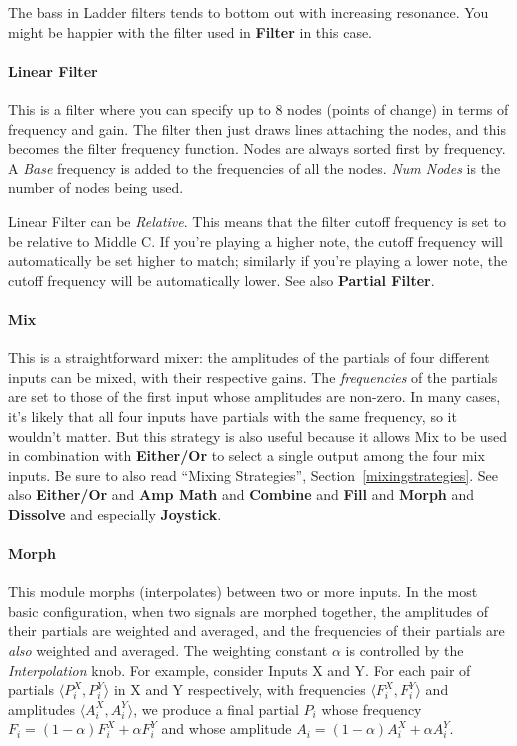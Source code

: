 \documentclass{article}
\begin{document}
The bass in Ladder filters tends to bottom out with increasing resonance.  You might be happier with the filter used in {\bf Filter} in this case.

\paragraph{Linear Filter} This is a filter where you can specify up to 8 nodes (points of change) in terms of frequency and gain.  The filter then just draws lines attaching the nodes, and this becomes the filter frequency function.  Nodes are always sorted first by frequency.  A {\it Base} frequency is added to the frequencies of all the nodes.  {\it Num Nodes} is the number of nodes being used.

Linear Filter can be {\it Relative}.  This means that the filter cutoff frequency is set to be relative to Middle C.  If you're playing a higher note, the cutoff frequency will automatically be set higher to match; similarly if you're playing a lower note, the cutoff frequency will be automatically lower.  See also {\bf Partial Filter}.

\paragraph{Mix} This is a straightforward mixer: the amplitudes of the partials of four different inputs can be mixed, with their respective gains.  The {\it frequencies} of the partials are set to those of the first input whose amplitudes are non-zero.  In many cases, it's likely that all four inputs have partials with the same frequency, so it wouldn't matter.  But this strategy is also useful because it allows Mix to be used in combination with {\bf Either/Or} to select a single output among the four mix inputs.  Be sure to also read ``Mixing Strategies'', Section~\ref{mixingstrategies}.  See also {\bf Either/Or} and {\bf Amp Math} and {\bf Combine} and {\bf Fill} and {\bf Morph} and {\bf Dissolve} and especially {\bf Joystick}.

\paragraph{Morph} This module morphs (interpolates) between two or more inputs.  In the most basic configuration, when two signals are morphed together, the amplitudes of their partials are weighted and averaged, and the frequencies of their partials are {\it also} weighted and averaged.  The weighting constant \(\alpha\) is controlled by the {\it Interpolation} knob.  For example, consider Inputs X and Y.  For each pair of partials \(\langle P^X_i, P^Y_i\rangle\) in X and Y respectively, with frequencies \(\langle F^X_i, F^Y_i\rangle\) and amplitudes \(\langle A^X_i, A^Y_i\rangle\), we produce a final partial \(P_i\) whose frequency \(F_i = (1-\alpha) F^X_i + \alpha F^Y_i\) and whose amplitude \(A_i = (1-\alpha) A^X_i + \alpha A^Y_i\).
\end{document}
